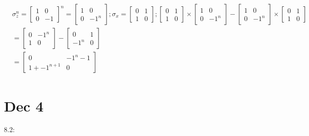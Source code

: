 \documentclass{article}
\begin{document}
\begin{align*}
  &\sigma_z^n=\begin{bmatrix}1&0\\0&-1\end{bmatrix}^n=\begin{bmatrix}1&0\\0&-1^n\end{bmatrix};\sigma_x=\begin{bmatrix}0&1\\1&0\end{bmatrix};\begin{bmatrix}0&1\\1&0\end{bmatrix}\times\begin{bmatrix}1&0\\0&-1^n\end{bmatrix}-\begin{bmatrix}1&0\\0&-1^n\end{bmatrix}\times\begin{bmatrix}0&1\\1&0\end{bmatrix} \\
  &=\begin{bmatrix}0&-1^n\\1&0\end{bmatrix}-\begin{bmatrix}0&1\\-1^n&0\end{bmatrix} \\
  &=\begin{bmatrix}0&-1^n-1\\1+-1^{n+1}&0\end{bmatrix} \\
\end{align*}

\newpage

\section{Dec 4}

8.2:
\end{document}
